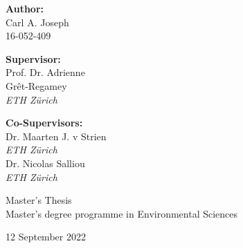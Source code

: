 \begin{titlepage}
\begin{center}
\vspace{2cm}    
\large    
    \textbf{Author:}\\
    Carl A. Joseph\\ 
    16-052-409\\
\vspace{1cm}   
    \begin{minipage}{5cm}
        \textbf{Supervisor:}\\
        Prof. Dr. Adrienne\\ Grêt-Regamey\\
        \textit{ETH Zürich}\\
    \end{minipage}
    \begin{minipage}{5cm}
        \begin{flushright}
            \textbf{Co-Supervisors:}\\
            Dr. Maarten J. v Strien\\
            \textit{ETH Zürich}\\
            Dr. Nicolas Salliou\\
            \textit{ETH Zürich}\\
        \end{flushright}
    \end{minipage}

\vspace{3cm}
\centering
    Master's Thesis\\
    Master's degree programme in Environmental Sciences

\vspace{1cm}
    12 September 2022\\

\end{center}
\end{titlepage}